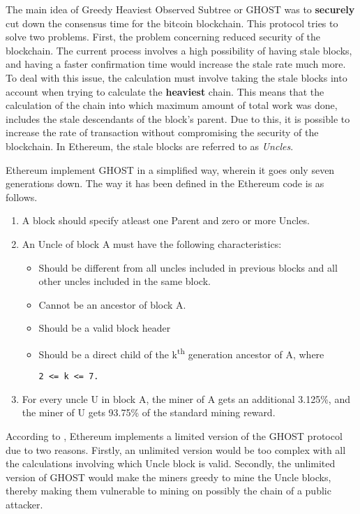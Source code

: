 \documentclass[english]{tktltiki}
\begin{document}
The main idea of Greedy Heaviest Observed Subtree or GHOST \cite{eth-whitepaper} was to \textbf{securely} cut down the consensus time for the bitcoin blockchain. This protocol tries to solve two problems. First, the problem concerning reduced security of the blockchain. The current process involves a high possibility of having stale blocks, and having a faster confirmation time would increase the stale rate much more. To deal with this issue, the calculation must involve taking the stale blocks into account when trying to calculate the \textbf{heaviest} chain. This means that the calculation of the chain into which maximum amount of total work was done, includes the stale descendants of the block's parent. Due to this, it is possible to increase the rate of transaction without compromising the security of the blockchain. In Ethereum, the stale blocks are referred to as \textit{Uncles}.

Ethereum implement GHOST in a simplified way, wherein it goes only seven generations down. The way it has been defined in the Ethereum code is as follows.

\begin{enumerate}
\item A block should specify atleast one Parent and zero or more Uncles.
\item An Uncle of block A must have the following characteristics:
\begin{itemize}
\item Should be different from all uncles included in previous blocks and all other uncles included in the same block.
\item Cannot be an ancestor of block A.
\item Should be a valid block header
\item Should be a direct child of the k\textsuperscript{th} generation ancestor of A, where \begin{verbatim}
2 <= k <= 7.
\end{verbatim} 
\end{itemize}
\item For every uncle U in block A, the miner of A gets an additional 3.125\%, and the miner of U gets 93.75\% of the standard mining reward.
\end{enumerate}

According to \cite{eth-whitepaper}, Ethereum implements a limited version of the GHOST protocol due to two reasons. Firstly, an unlimited version would be too complex with all the calculations involving which Uncle block is valid. Secondly, the unlimited version of GHOST would make the miners greedy to mine the Uncle blocks, thereby making them vulnerable to mining on possibly the chain of a public attacker.
\end{document}
